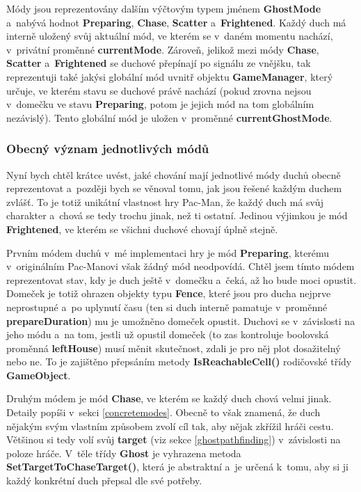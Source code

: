 \documentclass[a4]{article}
\begin{document}
Módy jsou reprezentovány dalším výčtovým typem jménem \textbf{GhostMode} a~nabývá hodnot \textbf{Preparing}, \textbf{Chase}, \textbf{Scatter} a~\textbf{Frightened}. Každý duch má interně uložený svůj aktuální mód, ve kterém se v~daném momentu nachází, v~privátní proměnné \textbf{currentMode}. Zároveň, jelikož mezi módy \textbf{Chase}, \textbf{Scatter} a~\textbf{Frightened} se duchové přepínají po signálu ze vnějšku, tak reprezentuji také jakýsi globální mód uvnitř objektu \textbf{GameManager}, který určuje, ve kterém stavu se duchové právě nachází (pokud zrovna nejsou v~domečku ve stavu \textbf{Preparing}, potom je jejich mód na tom globálním nezávislý). Tento globální mód je uložen v~proměnné \textbf{currentGhostMode}.

\subsubsection{Obecný význam jednotlivých módů} \label{modemeaning}
Nyní bych chtěl krátce uvést, jaké chování mají jednotlivé módy duchů obecně reprezentovat a~později bych se věnoval tomu, jak jsou řešené každým duchem zvlášť. To je totiž unikátní vlastnost hry Pac-Man, že každý duch má svůj charakter a~chová se tedy trochu jinak, než ti ostatní. Jedinou výjimkou je mód \textbf{Frightened}, ve kterém se všichni duchové chovají úplně stejně.

Prvním módem duchů v~mé implementaci hry je mód \textbf{Preparing}, kterému v~originálním Pac-Manovi však žádný mód neodpovídá. Chtěl jsem tímto módem reprezentovat stav, kdy je duch ještě v~domečku a~čeká, až ho bude moci opustit. Domeček je totiž ohrazen objekty typu \textbf{Fence}, které jsou pro ducha nejprve neprostupné a~po uplynutí času (ten si duch interně pamatuje v~proměnné \textbf{prepareDuration}) mu je umožněno domeček opustit. Duchovi se v~závislosti na jeho módu a~na tom, jestli už opustil domeček (to zas kontroluje boolovská proměnná \textbf{leftHouse}) musí měnit skutečnost, zdali je pro něj plot dosažitelný nebo ne. To je zajištěno přepsáním metody \textbf{IsReachableCell()} rodičovské třídy \textbf{GameObject}.

Druhým módem je mód \textbf{Chase}, ve kterém se každý duch chová velmi jinak. Detaily popíši v~sekci \ref{concretemodes}. Obecně to však znamená, že duch nějakým svým vlastním způsobem zvolí cíl tak, aby nějak zkřížil hráči cestu. Většinou si tedy volí svůj \textbf{target} (viz sekce \ref{ghostpathfinding}) v~závislosti na poloze hráče. V~těle třídy \textbf{Ghost} je vyhrazena metoda \textbf{SetTargetToChaseTarget()}, která je abstraktní a~je určená k~tomu, aby si ji každý konkrétní duch přepsal dle své potřeby.
\end{document}
